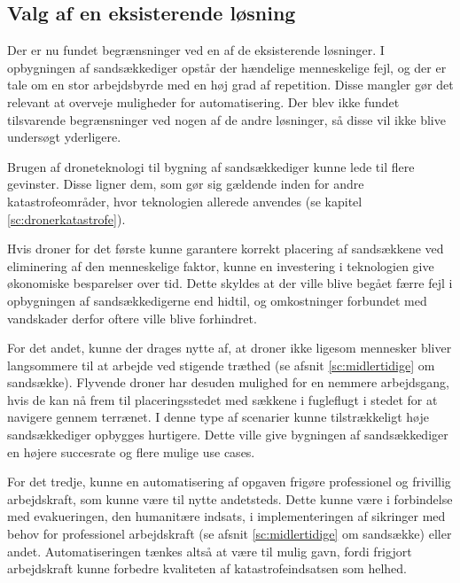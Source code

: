 \subsection{Valg af en eksisterende løsning} 
Der er nu fundet begrænsninger ved en af de eksisterende løsninger. I opbygningen af sandsækkediger opstår der hændelige menneskelige fejl, og der er tale om en stor arbejdsbyrde med en høj grad af repetition. Disse mangler gør det relevant at overveje muligheder for automatisering. Der blev ikke fundet tilsvarende begrænsninger ved nogen af de andre løsninger, så disse vil ikke blive undersøgt yderligere.  
\par
Brugen af droneteknologi til bygning af sandsækkediger kunne lede til flere gevinster. Disse ligner dem, som gør sig gældende inden for andre katastrofeområder, hvor teknologien allerede anvendes (se kapitel \ref{sc:dronerkatastrofe}). %
\par
Hvis droner for det første kunne garantere korrekt placering af sandsækkene ved eliminering af den menneskelige faktor, kunne en investering i teknologien give økonomiske besparelser over tid. Dette skyldes at der ville blive begået færre fejl i opbygningen af sandsækkedigerne end hidtil, og omkostninger forbundet med vandskader derfor oftere ville blive forhindret. 
\par
For det andet, kunne der drages nytte af, at droner ikke ligesom mennesker bliver langsommere til at arbejde ved stigende træthed (se afsnit \ref{sc:midlertidige} om sandsække). Flyvende droner har desuden mulighed for en nemmere arbejdsgang, hvis de kan nå frem til placeringsstedet med sækkene i fugleflugt i stedet for at navigere gennem terrænet. I denne type af scenarier kunne tilstrækkeligt høje sandsækkediger opbygges hurtigere. Dette ville give bygningen af sandsækkediger en højere succesrate og flere mulige use cases.
\par
For det tredje, kunne en automatisering af opgaven frigøre professionel og frivillig arbejdskraft, som kunne være til nytte andetsteds. Dette kunne være i forbindelse med evakueringen, den humanitære indsats, i implementeringen af sikringer med behov for professionel arbejdskraft (se afsnit \ref{sc:midlertidige} om sandsække) eller andet. Automatiseringen tænkes altså at være til mulig gavn, fordi frigjort arbejdskraft kunne forbedre kvaliteten af katastrofeindsatsen som helhed.
\par

